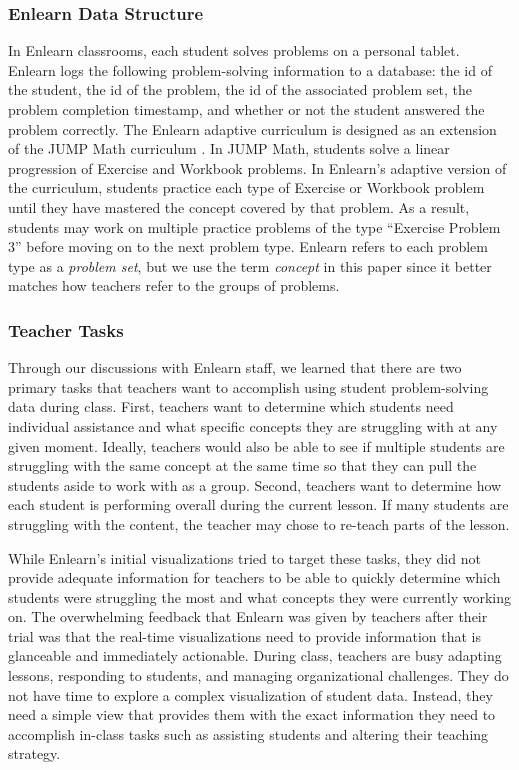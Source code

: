 \documentclass{sigchi}
\begin{document}
\subsubsection{Enlearn Data Structure}
In Enlearn classrooms, each student solves problems on a personal tablet. Enlearn logs the following problem-solving information to a database: the id of the student, the id of the problem, the id of the associated problem set, the problem completion timestamp,  and whether or not the student answered the problem correctly. The Enlearn adaptive curriculum is designed as an extension of the JUMP Math curriculum \cite{JUMPMath}. In JUMP Math, students solve a linear progression of Exercise and Workbook problems. In Enlearn's adaptive version of the curriculum, students practice each type of Exercise or Workbook problem until they have mastered the concept covered by that problem. As a result, students may work on multiple practice problems of the type ``Exercise Problem 3'' before moving on to the next problem type. Enlearn refers to each problem type as a \emph{problem set}, but we use the term \emph{concept} in this paper since it better matches how teachers refer to the groups of problems.

\subsubsection{Teacher Tasks}
Through our discussions with Enlearn staff, we learned that there are two primary tasks that teachers want to accomplish using student problem-solving data during class. First, teachers want to determine which students need individual assistance and what specific concepts they are struggling with at any given moment. Ideally, teachers would also be able to see if multiple students are struggling with the same concept at the same time so that they can pull the students aside to work with as a group. Second, teachers want to determine how each student is performing overall during the current lesson. If many students are struggling with the content, the teacher may chose to re-teach parts of the lesson.

While Enlearn's initial visualizations tried to target these tasks, they did not provide adequate information for teachers to be able to quickly determine which students were struggling the most and what concepts they were currently working on. The overwhelming feedback that Enlearn was given by teachers after their trial was that the real-time visualizations need to provide information that is glanceable and immediately actionable. During class, teachers are busy adapting lessons, responding to students, and managing organizational challenges. They do not have time to explore a complex visualization of student data. Instead, they need a simple view that provides them with the exact information they need to accomplish in-class tasks such as assisting students and altering their teaching strategy.
\end{document}

